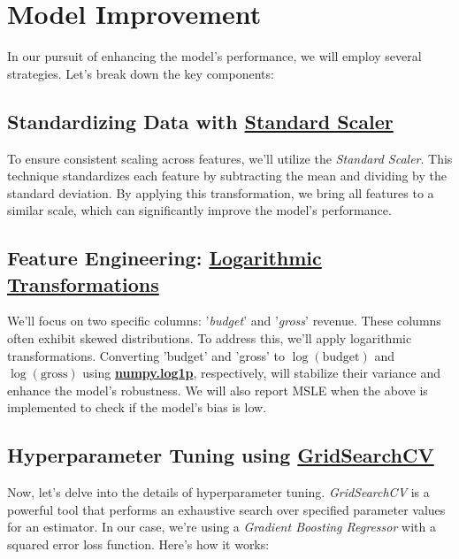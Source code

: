 \documentclass[conference]{IEEEtran}
\begin{document}
\section{Model Improvement}
    In our pursuit of enhancing the model's performance, we will employ several strategies. Let's break down the key components:
    
    \subsection{Standardizing Data with \href{https://scikit-learn.org/stable/modules/generated/sklearn.preprocessing.StandardScaler.html}{Standard Scaler}}
    
        To ensure consistent scaling across features, we'll utilize the \textit{Standard Scaler}. This technique standardizes each feature by subtracting the mean and dividing by the standard deviation. By applying this transformation, we bring all features to a similar scale, which can significantly improve the model's performance.
    
    \subsection{Feature Engineering: \href{https://numpy.org/doc/stable/reference/generated/numpy.log1p.html}{Logarithmic Transformations}}
    
        We'll focus on two specific columns: '\textit{budget}' and '\textit{gross}' revenue. These columns often exhibit skewed distributions. To address this, we'll apply logarithmic transformations. Converting 'budget' and 'gross' to \(\log(\text{budget})\) and \(\log(\text{gross})\) using \href{https://numpy.org/doc/stable/reference/generated/numpy.log1p.html}{\textbf{numpy.log1p}}, respectively, will stabilize their variance and enhance the model's robustness. We will also report MSLE when the above is implemented to check if the model's bias is low.
    
    \subsection{Hyperparameter Tuning using \href{https://scikit-learn.org/stable/modules/generated/sklearn.model_selection.GridSearchCV.html}{GridSearchCV}}
    
    Now, let's delve into the details of hyperparameter tuning. \textit{GridSearchCV} is a powerful tool that performs an exhaustive search over specified parameter values for an estimator. In our case, we're using a \textit{Gradient Boosting Regressor} with a squared error loss function. Here's how it works:
    
\end{document}

